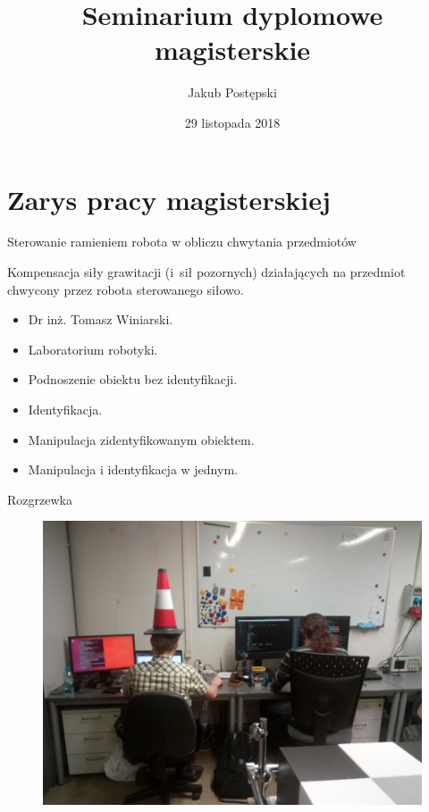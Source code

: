 \documentclass{beamer}
\begin{document}
\title{Seminarium dyplomowe magisterskie}
\author{Jakub Postępski}
\date{29 listopada 2018}

\frame{\titlepage}

\section{Zarys pracy magisterskiej}

\begin{frame}{Sterowanie ramieniem robota w obliczu chwytania przedmiotów}

Kompensacja siły grawitacji (i~sił pozornych) działających na przedmiot chwycony przez robota sterowanego siłowo.

\begin{itemize}
	\item Dr inż. Tomasz Winiarski.
	\item Laboratorium robotyki.
\end{itemize}

\begin{itemize}
	\item Podnoszenie obiektu bez identyfikacji.
	\item Identyfikacja.
	\item Manipulacja zidentyfikowanym obiektem.
	\item Manipulacja i identyfikacja w jednym.
\end{itemize}
\end{frame}

\begin{frame}{Rozgrzewka}
\begin{figure}[h]
	\centering
	\includegraphics[scale=0.06]{daniel}
\end{figure}
\end{frame}
\end{document}
